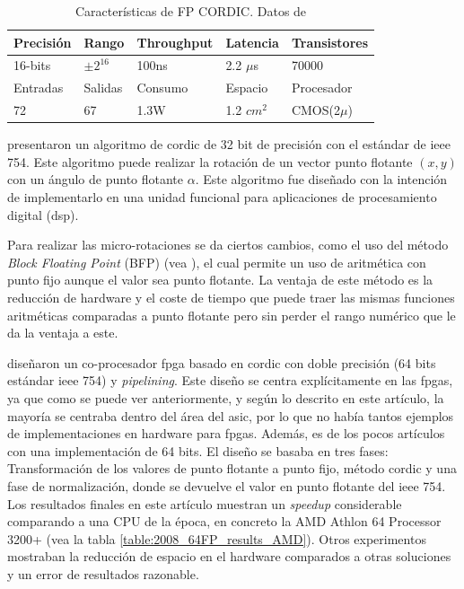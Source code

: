 \begin{table}[]
	\centering
	\begin{tabular}{|l|l|l|l|l|}
		\hline
		Precisión & Rango                 & Throughput & Latencia                  & Transistores \\ \hline
		16-bits   & $\pm2^{16}$ & 100ns      & 2.2 $\mu$s                     & 70000        \\
		\hline
		Entradas  & Salidas               & Consumo    & Espacio                   & Procesador   \\ \hline
		72        & 67                    & 1.3W       & 1.2 $cm^2$ & CMOS(2$\mu$) \\ \hline   
	\end{tabular}
	\caption{Características de FP CORDIC. Datos de \cite{de_lange_optimal_1988}}
	\label{table:FP_CORDIC_feature}
\end{table}

\cite{hekstra_floating_1993} presentaron un algoritmo de \gls{cordic} de 32 bit de precisión con el estándar de \gls{ieee} 754. Este algoritmo puede realizar la rotación de un vector punto flotante $(x,y)$ con un ángulo de punto flotante $\alpha$. Este algoritmo fue diseñado con la intención de implementarlo en una unidad funcional para aplicaciones de procesamiento digital (\gls{dsp}).

Para realizar las micro-rotaciones se da ciertos cambios, como el uso del método \textit{Block Floating Point} (BFP) (vea \cite{noauthor_fftifft_2005}), el cual permite un uso de aritmética con punto fijo aunque el valor sea punto flotante. La ventaja de este método es la reducción de hardware y el coste de tiempo que puede traer las mismas funciones aritméticas comparadas a punto flotante pero sin perder el rango numérico que le da la ventaja a este.

\cite{zhou_double_2008} diseñaron un co-procesador \gls{fpga} basado en \gls{cordic} con doble precisión (64 bits estándar \gls{ieee} 754) y \textit{pipelining}. Este diseño se centra explícitamente en las \gls{fpga}s, ya que como se puede ver anteriormente, y según lo descrito en este artículo, la mayoría se centraba dentro del área del \gls{asic}, por lo que no había tantos ejemplos de implementaciones en hardware para \gls{fpga}s. Además, es de los pocos artículos con una implementación de 64 bits. El diseño se basaba en tres fases: Transformación de los valores de punto flotante a punto fijo, método \gls{cordic} y una fase de normalización, donde se devuelve el valor en punto flotante del \gls{ieee} 754. Los resultados finales en este artículo muestran un \textit{speedup} considerable comparando a una CPU de la época, en concreto la AMD Athlon 64 Processor 3200+ (vea la tabla \ref{table:2008_64FP_results_AMD}). Otros experimentos mostraban la reducción de espacio en el hardware comparados a otras soluciones y un error de resultados razonable.

